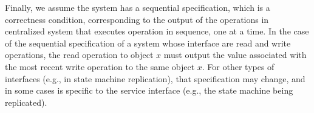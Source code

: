 \documentclass[acmlarge, ,11pt]{acmart}
\begin{document}
Finally, we assume the system has a sequential specification, which is a correctness condition, corresponding to the output of the operations in centralized system that executes operation in sequence, one at a time. In the case of the sequential specification of a system whose interface are read and write operations, the read operation to object $x$ must output the value associated with the most recent write operation to the same object $x$. For other types of interfaces (e.g., in state machine replication), that specification may change, and in some cases is specific to the service interface (e.g., the state machine being replicated).
\end{document}
